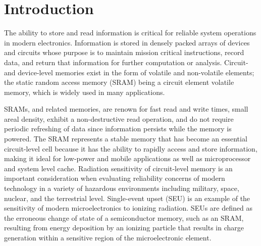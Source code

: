 \chapter{Introduction} %
\label{cha:introduction}
The ability to store and read information is critical for reliable system operations in modern electronics. 
Information is stored in densely packed arrays of devices and circuits whose purpose is to maintain mission critical instructions, record data, and return that information for further computation or analysis.
Circuit- and device-level memories exist in the form of volatile and non-volatile elements; the static random access memory (SRAM) being a circuit element volatile memory, which is widely used in many applications.

SRAMs, and related memories, are renown for fast read and write times, small areal density, exhibit a non-destructive read operation, and do not require periodic refreshing of data since information persists while the memory is powered.
The SRAM represents a stable memory that has become an essential circuit-level cell because it has the ability to rapidly access and store information, making it ideal for low-power and mobile applications as well as microprocessor and system level cache.
Radiation sensitivity of circuit-level memory is an important consideration when evaluating reliability concerns of modern technology in a variety of hazardous environments including military, space, nuclear, and the terrestrial level. 
Single-event upset (SEU) is an example of the sensitivity of modern microelectronics to ionizing radiation. SEUs are defined as the erroneous change of state of a semiconductor memory, such as an SRAM, resulting from energy deposition by an ionizing particle that results in charge generation within a sensitive region of the microelectronic element.

